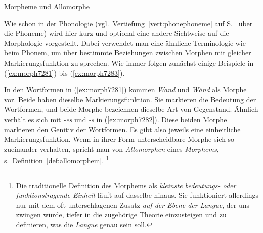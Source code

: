 \begin{Vertiefung}{Morpheme und Allomorphe}

\label{vert:morphemeallomorphe}

\noindent Wie schon in der Phonologie (vgl.\ Vertiefung~\ref{vert:phonephoneme} auf S.~\pageref{vert:phonephoneme} über die Phoneme) wird hier kurz und optional eine andere Sichtweise auf die Morphologie vorgestellt.
Dabei verwendet man eine ähnliche Terminologie wie beim Phonem, um über bestimmte Beziehungen zwischen Morphen mit gleicher Markierungsfunktion zu sprechen.
Wie immer folgen zunächst einige Beispiele in (\ref{ex:morph7281}) bis (\ref{ex:morph7283}).

\begin{exe}
  \ex\label{ex:morph7281}
  \begin{xlist}
  \end{xlist}
  \ex\label{ex:morph7282}
  \begin{xlist}
  \end{xlist}


  \ex\label{ex:morph7283}
  \begin{xlist}
  \end{xlist}
\end{exe}

In den Wortformen in (\ref{ex:morph7281}) kommen \textit{Wand} und \textit{Wänd} als Morphe vor.
Beide haben dieselbe Markierungsfunktion.
Sie markieren die Bedeutung der Wortformen, und beide Morphe bezeichnen dieselbe Art von Gegenstand.
Ähnlich verhält es sich mit \textit{-es} und \textit{-s} in (\ref{ex:morph7282}).
Diese beiden Morphe markieren den Genitiv der Wortformen.
Es gibt also jeweils eine einheitliche Markierungsfunktion.
Wenn in ihrer Form unterscheidbare Morphe sich so zueinander verhalten, spricht man von \textit{Allomorphen} eines \textit{Morphems}, s.\ Definition~\ref{def:allomorphem}.%
\footnote{Die traditionelle Definition des Morphems als \textit{kleinste bedeutungs- oder funktionstragende Einheit} läuft auf dasselbe hinaus.
Sie funktioniert allerdings nur mit dem oft unterschlagenen Zusatz \textit{auf der Ebene der Langue}, der uns zwingen würde, tiefer in die zugehörige Theorie einzusteigen und zu definieren, was die \textit{Langue} genau sein soll.}



\end{Vertiefung}
